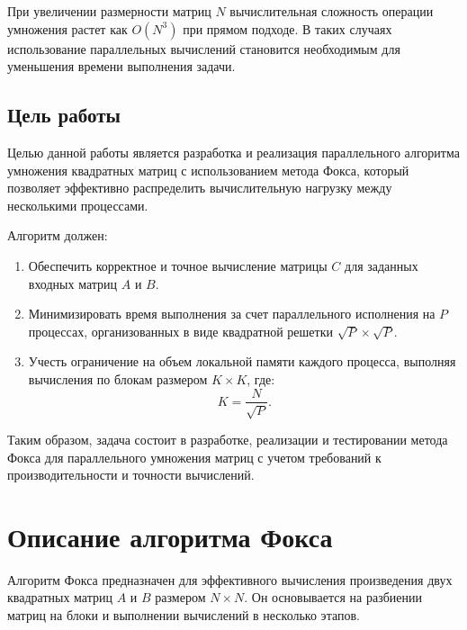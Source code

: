 \documentclass{report}
\begin{document}
	При увеличении размерности матриц $N$ вычислительная сложность операции умножения растет как $O(N^3)$ при прямом подходе. В таких случаях использование параллельных вычислений становится необходимым для уменьшения времени выполнения задачи.
	
	\subsection*{Цель работы}
	Целью данной работы является разработка и реализация параллельного алгоритма умножения квадратных матриц с использованием метода Фокса, который позволяет эффективно распределить вычислительную нагрузку между несколькими процессами. 
	
	Алгоритм должен:
	\begin{enumerate}
		\item Обеспечить корректное и точное вычисление матрицы $C$ для заданных входных матриц $A$ и $B$.
		\item Минимизировать время выполнения за счет параллельного исполнения на $P$ процессах, организованных в виде квадратной решетки $\sqrt{P} \times \sqrt{P}$.
		\item Учесть ограничение на объем локальной памяти каждого процесса, выполняя вычисления по блокам размером $K \times K$, где:
		\[
		K = \frac{N}{\sqrt{P}}.
		\]
	\end{enumerate}
	
	
	Таким образом, задача состоит в разработке, реализации и тестировании метода Фокса для параллельного умножения матриц с учетом требований к производительности и точности вычислений.
	\newpage
	
\section*{Описание алгоритма Фокса}

Алгоритм Фокса предназначен для эффективного вычисления произведения двух квадратных матриц $A$ и $B$ размером $N \times N$. Он основывается на разбиении матриц на блоки и выполнении вычислений в несколько этапов.
\end{document}

